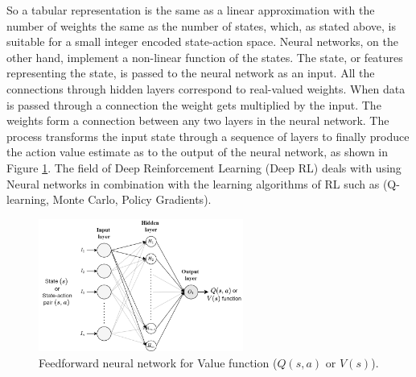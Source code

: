 So a tabular representation is the same as a linear approximation with the number of weights the same as the number of states, which, as stated above, is suitable for a small integer encoded state-action space. Neural networks, on the other hand, implement a non-linear function of the states. The state, or features representing the state, is passed to the neural network as an input. All the connections through hidden layers correspond to real-valued weights. When data is passed through a connection the weight gets multiplied by the input. The weights form a connection between any two layers in the neural network.
The process transforms the input state through a sequence of layers to finally produce the action value estimate as to the output of the neural network, as shown in Figure \ref{fig:RL_nn_architecture}. The field of Deep Reinforcement Learning (Deep RL) deals with using Neural networks in combination with the learning algorithms of RL such as (Q-learning, Monte Carlo, Policy Gradients).

\begin{figure}[h!]
    \centering
    \includegraphics[width=0.6\textwidth]{Figures/Ch_RL/RL_nn_architecture_2.png}
    \caption{Feedforward neural network for Value function ($Q(s,a)$ or $V(s)$).}
    \label{fig:RL_nn_architecture}
\end{figure}

